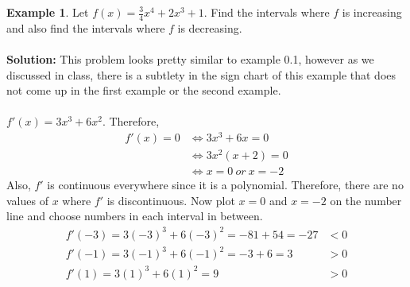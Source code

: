 \documentclass[reqno,psamsfonts]{amsart}
\theoremstyle{definition}
\newtheorem{exmp}[thm]{Example}
\theoremstyle{remark}
\numberwithin{equation}{section}
\begin{document}
\begin{exmp}
Let $f(x) = \frac{3}{4}x^4+2x^3+1$. Find the intervals where $f$ is increasing and also find the intervals where $f$ is decreasing.   
\\
\\\textbf{Solution:} This problem looks pretty similar to example 0.1, however as we discussed in class, there is a subtlety in the sign chart of this example that does not come up in the first example or the second example. 
\\
\\$f'(x)=3x^3+6x^2$. Therefore, 
\begin{align*}
f'(x) = 0&\iff 3x^3+6x=0\\
&\iff 3x^2(x+2)=0\\
&\iff x=0\ or\ x=-2
\end{align*}
Also, $f'$ is continuous everywhere since it is a polynomial. Therefore, there are no values of $x$ where $f'$ is discontinuous. Now plot $x=0$ and $x=-2$ on the number line and choose numbers in each interval in between. 
\begin{align*}
f'(-3) = 3(-3)^3+6(-3)^2=-81+54=-27&<0\\
f'(-1) = 3(-1)^3+6(-1)^2=-3+6=3&>0\\
f'(1) =3(1)^3+6(1)^2=9&>0
\end{align*}


\end{exmp}
\end{document}

